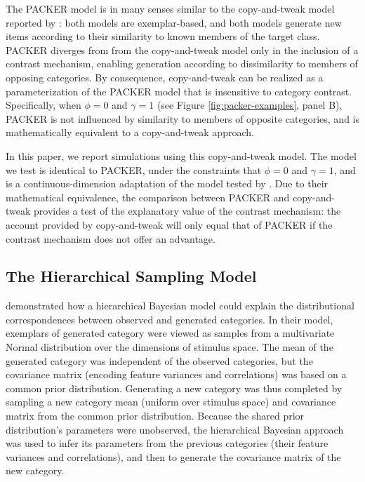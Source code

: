 \documentclass[12pt]{article}
\begin{document}
\begin{flushleft}
The PACKER model is in many senses similar to the copy-and-tweak model reported by \cite{jern2013probabilistic}: both models are exemplar-based, and both models generate new items according to their similarity to known members of the target class. PACKER diverges from from the copy-and-tweak model only in the inclusion of a contrast mechanism, enabling generation according to dissimilarity to members of opposing categories. By consequence, copy-and-tweak can be realized as a parameterization of the PACKER model that is insensitive to category contrast. Specifically, when $\phi = 0$ and $\gamma = 1$ (see Figure \ref{fig:packer-examples}, panel B), PACKER is not influenced by similarity to members of opposite categories, and is mathematically equivalent to a copy-and-tweak approach.

In this paper, we report simulations using this copy-and-tweak model. The model we test is identical to PACKER, under the constraints that $\phi = 0$ and $\gamma = 1$, and is a continuous-dimension adaptation of the model tested by \cite{jern2013probabilistic}. Due to their mathematical equivalence, the comparison between PACKER and copy-and-tweak provides a test of the explanatory value of the contrast mechanism: the account provided by copy-and-tweak will only equal that of PACKER if the contrast mechanism does not offer an advantage.


\subsection{The Hierarchical Sampling Model}

\cite{jern2013probabilistic} demonstrated how a hierarchical Bayesian model could explain the distributional correspondences between observed and generated categories. In their model, exemplars of generated category were viewed as samples from a multivariate Normal distribution over the dimensions of stimulus space. The mean of the generated category was independent of the observed categories, but the covariance matrix (encoding feature variances and correlations) was based on a common prior distribution. Generating a new category was thus completed by sampling a new category mean (uniform over stimulus space) and covariance matrix from the common prior distribution. Because the shared prior distribution's parameters were unobserved, the hierarchical Bayesian approach was used to infer its parameters from the previous categories (their feature variances and correlations), and then to generate the covariance matrix of the new category.


\end{flushleft}
\end{document}
